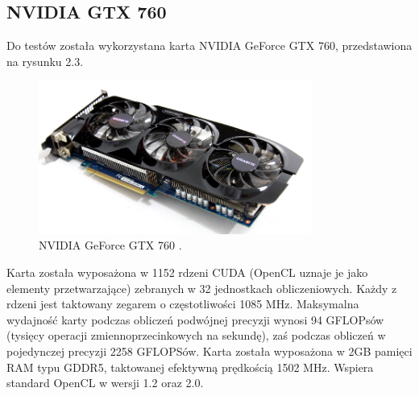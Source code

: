 \subsection{NVIDIA GTX 760}
Do testów została wykorzystana karta NVIDIA GeForce GTX 760, przedstawiona na rysunku 2.3. \\
\begin{figure}[h]
\centering
\includegraphics[width=0.8\textwidth]{figures/gtx.png}
\caption{NVIDIA GeForce GTX 760 \protect\footnotemark.}%
\label{rys:NVIDIA GeForce GTX 760}
\end{figure}
Karta została wyposażona w 1152 rdzeni CUDA (OpenCL uznaje je jako elementy przetwarzające) zebranych w 32 jednostkach obliczeniowych. Każdy z rdzeni jest taktowany zegarem o częstotliwości 1085 MHz. Maksymalna wydajność karty podczas obliczeń podwójnej precyzji wynosi 94 GFLOPsów (tysięcy operacji zmiennoprzecinkowych na sekundę), zaś podczas obliczeń w pojedynczej precyzji 2258 GFLOPSów. Karta została wyposażona w 2GB pamięci RAM typu GDDR5, taktowanej efektywną prędkością 1502 MHz. Wspiera standard OpenCL w wersji 1.2 oraz 2.0. \footnotemark[4]\\
\newpage
